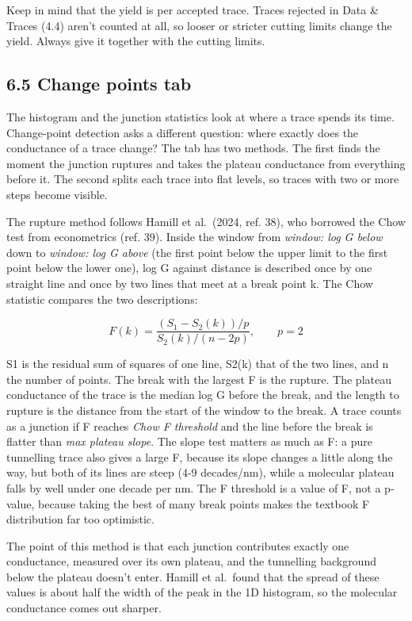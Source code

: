 \documentclass[
  11pt,
  a4paper,
]{article}
\begin{document}
Keep in mind that the yield is per accepted trace. Traces rejected in
Data \& Traces (4.4) aren't counted at all, so looser or stricter
cutting limits change the yield. Always give it together with the
cutting limits.

\hypertarget{change-points-tab}{%
\subsection{6.5 Change points tab}\label{change-points-tab}}

The histogram and the junction statistics look at where a trace spends
its time. Change-point detection asks a different question: where
exactly does the conductance of a trace change? The tab has two methods.
The first finds the moment the junction ruptures and takes the plateau
conductance from everything before it. The second splits each trace into
flat levels, so traces with two or more steps become visible.

The rupture method follows Hamill et al.~(2024, ref. 38), who borrowed
the Chow test from econometrics (ref. 39). Inside the window from
\emph{window: log G below} down to \emph{window: log G above} (the first
point below the upper limit to the first point below the lower one), log
G against distance is described once by one straight line and once by
two lines that meet at a break point k. The Chow statistic compares the
two descriptions:

\[
F(k) = \frac{\left(S_1 - S_2(k)\right)/p}{S_2(k)/(n - 2p)}, \qquad p = 2
\]

S1 is the residual sum of squares of one line, S2(k) that of the two
lines, and n the number of points. The break with the largest F is the
rupture. The plateau conductance of the trace is the median log G before
the break, and the length to rupture is the distance from the start of
the window to the break. A trace counts as a junction if F reaches
\emph{Chow F threshold} and the line before the break is flatter than
\emph{max plateau slope}. The slope test matters as much as F: a pure
tunnelling trace also gives a large F, because its slope changes a
little along the way, but both of its lines are steep (4-9 decades/nm),
while a molecular plateau falls by well under one decade per nm. The F
threshold is a value of F, not a p-value, because taking the best of
many break points makes the textbook F distribution far too optimistic.

The point of this method is that each junction contributes exactly one
conductance, measured over its own plateau, and the tunnelling
background below the plateau doesn't enter. Hamill et al.~found that the
spread of these values is about half the width of the peak in the 1D
histogram, so the molecular conductance comes out sharper.
\end{document}
